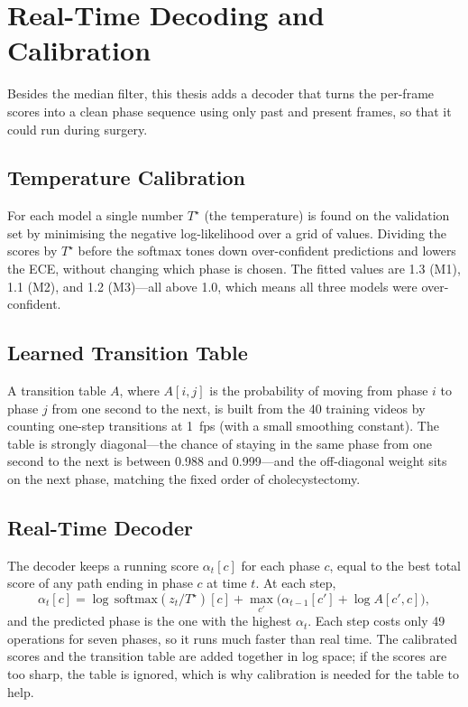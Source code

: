 \section{Real-Time Decoding and Calibration}
\label{sec:decoding}

Besides the median filter, this thesis adds a decoder that turns the per-frame scores into a clean phase sequence using only past and present frames, so that it could run during surgery.

\subsection{Temperature Calibration}

For each model a single number $T^\star$ (the temperature) is found on the validation set by minimising the negative log-likelihood over a grid of values. Dividing the scores by $T^\star$ before the softmax tones down over-confident predictions and lowers the ECE, without changing which phase is chosen. The fitted values are 1.3 (M1), 1.1 (M2), and 1.2 (M3)---all above 1.0, which means all three models were over-confident.

\subsection{Learned Transition Table}

A transition table $A$, where $A[i, j]$ is the probability of moving from phase $i$ to phase $j$ from one second to the next, is built from the 40 training videos by counting one-step transitions at 1~fps (with a small smoothing constant). The table is strongly diagonal---the chance of staying in the same phase from one second to the next is between 0.988 and 0.999---and the off-diagonal weight sits on the next phase, matching the fixed order of cholecystectomy.

\subsection{Real-Time Decoder}

The decoder keeps a running score $\alpha_t[c]$ for each phase $c$, equal to the best total score of any path ending in phase $c$ at time $t$. At each step,
\begin{equation}
\alpha_t[c] = \log\,\text{softmax}(z_t / T^\star)[c] + \max_{c'} \big( \alpha_{t-1}[c'] + \log A[c', c] \big),
\label{eq:viterbi}
\end{equation}
and the predicted phase is the one with the highest $\alpha_t$. Each step costs only 49 operations for seven phases, so it runs much faster than real time. The calibrated scores and the transition table are added together in log space; if the scores are too sharp, the table is ignored, which is why calibration is needed for the table to help.

